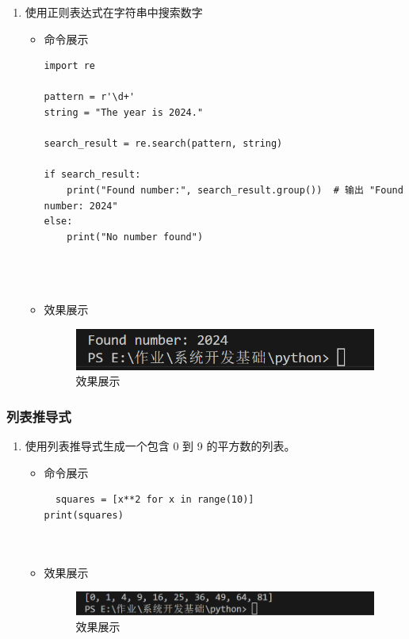 \documentclass[UTF8]{ctexart}
\begin{document}
\begin{enumerate}
  \item 使用正则表达式在字符串中搜索数字
  \begin{itemize}
  \item 命令展示
  \begin{verbatim}
import re

pattern = r'\d+'
string = "The year is 2024."

search_result = re.search(pattern, string)

if search_result:
    print("Found number:", search_result.group())  # 输出 "Found number: 2024"
else:
    print("No number found")


    
  \end{verbatim}

  \item 效果展示
  \begin{figure}[H]
    \centering
    \includegraphics[width=\textwidth]{2111} %
    \caption{效果展示}
  
  \end{figure}
\end{itemize}
\end{enumerate}





\subsubsection{列表推导式}

\begin{enumerate}
  \item 使用列表推导式生成一个包含 0 到 9 的平方数的列表。
  \begin{itemize}
  \item 命令展示
  \begin{verbatim}
  squares = [x**2 for x in range(10)]
print(squares)

    
  \end{verbatim}

  \item 效果展示
  \begin{figure}[H]
    \centering
    \includegraphics[width=\textwidth]{2112} %
    \caption{效果展示}
  
  \end{figure}
\end{itemize}
\end{enumerate}
\end{document}
